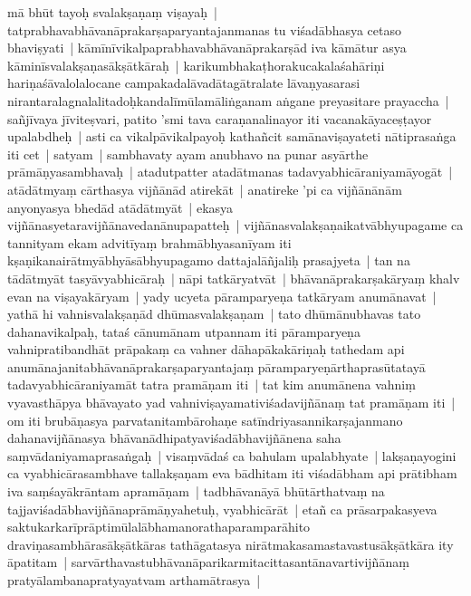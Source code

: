 \documentclass[article,12pt,a4paper]{memoir}%
\newcounter{parCount}
\begin{document}
	  
	  \pstart \leavevmode%
	\label{thakur75-10.28}mā bhūt tayoḥ svalakṣaṇaṃ viṣayaḥ | tatprabhavabhāvanāprakarṣaparyantajanmanas tu viśadābhasya cetaso bhaviṣyati | kāmīnīvikalpaprabhavabhāvanāprakarṣād iva kāmātur asya kāminīsvalakṣaṇasākṣātkāraḥ | karikumbhakaṭhorakucakalaśahāriṇi hariṇaśāvalolalocane campakadalāvadātagātralate lāvaṇyasarasi nirantaralagnalalitadoḥkandalīmūlamāliṅganam aṅgane preyasitare prayaccha | sañjīvaya jīviteṣvari, patito 'smi tava caraṇanalinayor iti vacanakāyaceṣṭayor upalabdheḥ | asti ca vikalpāvikalpayoḥ kathañcit samānaviṣayateti nātiprasaṅga iti cet | satyam | sambhavaty ayam anubhavo na punar asyārthe prāmāṇyasambhavaḥ | atadutpatter atadātmanas tadavyabhicāraniyamāyogāt | atādātmyaṃ cārthasya vijñānād atirekāt | anatireke 'pi ca vijñānānām anyonyasya bhedād atādātmyāt | ekasya vijñānasyetaravijñānavedanānupapatteḥ | vijñānasvalakṣaṇaikatvābhyupagame ca tannityam ekam advitīyaṃ brahmābhyasanīyam iti kṣaṇikanairātmyābhyāsābhyupagamo dattajalāñjaliḥ prasajyeta | tan na tādātmyāt tasyāvyabhicāraḥ | nāpi tatkāryatvāt | bhāvanāprakarṣakāryaṃ khalv evan na viṣayakāryam | yady ucyeta pāramparyeṇa tatkāryam anumānavat | yathā hi vahnisvalakṣaṇād dhūmasvalakṣaṇam | tato dhūmānubhavas tato dahanavikalpaḥ, tataś cānumānam utpannam iti pāramparyeṇa vahnipratibandhāt prāpakaṃ ca vahner dāhapākakāriṇaḥ tathedam api anumānajanitabhāvanāprakarṣaparyantajaṃ pāramparyeṇārthaprasūtatayā tadavyabhicāraniyamāt tatra pramāṇam iti | tat kim anumānena vahniṃ vyavasthāpya bhāvayato yad vahniviṣayamativiśadavijñānaṃ tat pramāṇam iti | om iti brubāṇasya parvatanitambārohaṇe satīndriyasannikarṣajanmano dahanavijñānasya bhāvanādhipatyaviśadābhavijñānena saha saṃvādaniyamaprasaṅgaḥ | visaṃvādaś ca bahulam upalabhyate | lakṣaṇayogini ca vyabhicārasambhave tallakṣaṇam eva bādhitam iti viśadābham api prātibham iva saṃśayākrāntam apramāṇam | tadbhāvanāyā bhūtārthatvaṃ na tajjaviśadābhavijñānaprāmāṇyahetuḥ, vyabhicārāt | etañ ca prāsarpakasyeva saktukarkarīprāptimūlalābhamanorathaparamparāhito draviṇasambhārasākṣātkāras tathāgatasya nirātmakasamastavastusākṣātkāra ity āpatitam | sarvārthavastubhāvanāparikarmitacittasantānavartivijñānaṃ pratyālambanapratyayatvam arthamātrasya | 
	{}
	\pend%
      
\end{document}
